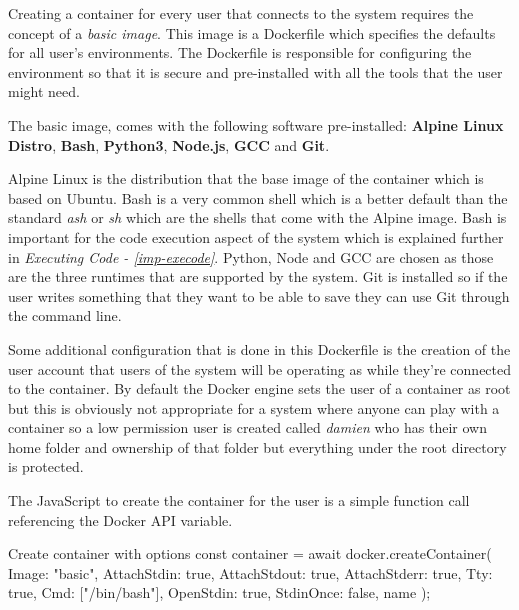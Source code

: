 Creating a container for every user that connects to the system requires the concept of a \textit{basic image}. This image is a Dockerfile which specifies the defaults for all user's environments. The Dockerfile is responsible for configuring the environment so that it is secure and pre-installed with all the tools that the user might need.

The basic image, comes with the following software pre-installed: \textbf{Alpine Linux Distro}, \textbf{Bash}, \textbf{Python3}, \textbf{Node.js}, \textbf{GCC} and \textbf{Git}.

Alpine Linux is the distribution that the base image of the container which is based on Ubuntu. Bash is a very common shell which is a better default than the standard \textit{ash} or \textit{sh} which are the shells that come with the Alpine image. Bash is important for the code execution aspect of the system which is explained further in \textit{Executing Code - \ref{imp-execode}}. Python, Node and GCC are chosen as those are the three runtimes that are supported by the system. Git is installed so if the user writes something that they want to be able to save they can use Git through the command line.

Some additional configuration that is done in this Dockerfile is the creation of the user account that users of the system will be operating as while they're connected to the container. By default the Docker engine sets the user of a container as root but this is obviously not appropriate for a system where anyone can play with a container so a low permission user is created called \textit{damien} who has their own home folder and ownership of that folder but everything under the root directory is protected.

The JavaScript to create the container for the user is a simple function call referencing the Docker API variable.

\begin{sexylisting}{Create container with options}
const container = await docker.createContainer({
    Image: "basic",
    AttachStdin: true,
    AttachStdout: true,
    AttachStderr: true,
    Tty: true,
    Cmd: ["/bin/bash"],
    OpenStdin: true,
    StdinOnce: false,
    name
});
\end{sexylisting}

